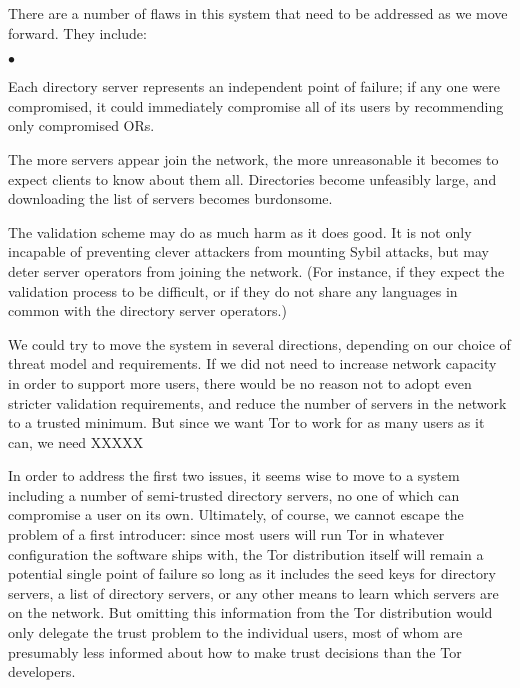 \documentclass{llncs}
\newenvironment{tightlist}{\begin{list}{$\bullet$}{
  \setlength{\itemsep}{0mm}
    \setlength{\parsep}{0mm}
    }}{\end{list}}
\begin{document}
There are a number of flaws in this system that need to be addressed as we
move forward.  They include:
\begin{tightlist}
\item Each directory server represents an independent point of failure; if
  any one were compromised, it could immediately compromise all of its users
  by recommending only compromised ORs.
\item The more servers appear join the network, the more unreasonable it
  becomes to expect clients to know about them all.  Directories
  become unfeasibly large, and downloading the list of servers becomes
  burdonsome.
\item The validation scheme may do as much harm as it does good.  It is not
  only incapable of preventing clever attackers from mounting Sybil attacks,
  but may deter server operators from joining the network.  (For instance, if
  they expect the validation process to be difficult, or if they do not share
  any languages in common with the directory server operators.)
\end{tightlist}

We could try to move the system in several directions, depending on our
choice of threat model and requirements.  If we did not need to increase
network capacity in order to support more users, there would be no reason not
to adopt even stricter validation requirements, and reduce the number of
servers in the network to a trusted minimum.  But since we want Tor to work
for as many users as it can, we need XXXXX

In order to address the first two issues, it seems wise to move to a system
including a number of semi-trusted directory servers, no one of which can
compromise a user on its own.  Ultimately, of course, we cannot escape the
problem of a first introducer: since most users will run Tor in whatever
configuration the software ships with, the Tor distribution itself will
remain a potential single point of failure so long as it includes the seed
keys for directory servers, a list of directory servers, or any other means
to learn which servers are on the network.  But omitting this information
from the Tor distribution would only delegate the trust problem to the
individual users, most of whom are presumably less informed about how to make
trust decisions than the Tor developers.

\end{document}
